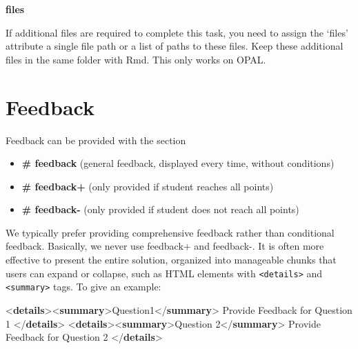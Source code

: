\documentclass[twoside]{tufte-book}
\newenvironment{Shaded}{}{}
\newcommand{\DataTypeTok}[1]{\textcolor[rgb]{0.56,0.13,0.00}{#1}}
\newcommand{\KeywordTok}[1]{\textcolor[rgb]{0.00,0.44,0.13}{\textbf{#1}}}
\newcommand{\NormalTok}[1]{#1}
\providecommand{\tightlist}{%
  \setlength{\itemsep}{0pt}\setlength{\parskip}{0pt}}
\begin{document}
\noindent\textbf{files}\label{files}

If additional files are required to complete this task, you need to assign the `files' attribute a single file path or a list of paths to these files. Keep these additional files in the same folder with Rmd. This only works on OPAL.

\section{Feedback}\label{feedback}

Feedback can be provided with the section

\begin{itemize}
\tightlist
\item
  \textbf{\# feedback} (general feedback, displayed every time, without conditions)
\item
  \textbf{\# feedback+} (only provided if student reaches all points)
\item
  \textbf{\# feedback-} (only provided if student does not reach all points)
\end{itemize}

We typically prefer providing comprehensive feedback rather than conditional feedback. Basically, we never use feedback+ and feedback-. It is often more effective to present the entire solution, organized into manageable chunks that users can expand or collapse, such as HTML elements with \texttt{\textless{}details\textgreater{}} and \texttt{\textless{}summary\textgreater{}} tags. To give an example:

\begin{Shaded}
\begin{Highlighting}[]
\DataTypeTok{\textless{}}\KeywordTok{details}\DataTypeTok{\textgreater{}\textless{}}\KeywordTok{summary}\DataTypeTok{\textgreater{}}\NormalTok{Question1}\DataTypeTok{\textless{}/}\KeywordTok{summary}\DataTypeTok{\textgreater{}}
\NormalTok{  Provide Feedback for Question 1}
\DataTypeTok{\textless{}/}\KeywordTok{details}\DataTypeTok{\textgreater{}}
\DataTypeTok{\textless{}}\KeywordTok{details}\DataTypeTok{\textgreater{}\textless{}}\KeywordTok{summary}\DataTypeTok{\textgreater{}}\NormalTok{Question 2}\DataTypeTok{\textless{}/}\KeywordTok{summary}\DataTypeTok{\textgreater{}}
\NormalTok{  Provide Feedback for Question 2}
\DataTypeTok{\textless{}/}\KeywordTok{details}\DataTypeTok{\textgreater{}}
\end{Highlighting}
\end{Shaded}
\end{document}
